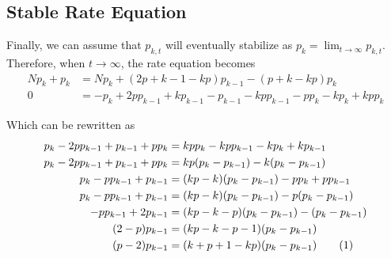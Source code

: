 \subsection{Stable Rate Equation}

    Finally, we can assume that $p_{k,t}$ will eventually stabilize as $p_k = \lim_{t \to \infty} p_{k,t}$. Therefore, when $t \to \infty$, the rate equation becomes
    \begin{align*}
        N p_k + p_k &= N p_k + (2p + k - 1 - k p) p_{k-1} - (p + k - k p) p_k \\
        0 &= -p_k + 2p p_{k-1} + k p_{k-1} - p_{k-1} - k p p_{k-1} - p p_k - k p_k + k p p_k
    \end{align*}

    Which can be rewritten as
    \begin{align*}
        p_k - 2p p_{k-1} + p_{k-1} + p p_k &= k p p_k - k p p_{k-1} - k p_{k} + k p_{k-1} \\
        p_k - 2 p p_{k-1} + p_{k-1} + p p_k &= k p (p_k - p_{k-1}) - k (p_k - p_{k-1}) \\
        p_k - p p_{k-1} + p_{k-1} &= (k p - k) (p_k - p_{k-1}) - p p_k + p p_{k-1} \\
        p_k - p p_{k-1} + p_{k-1} &= (k p - k) (p_k - p_{k-1}) - p (p_k - p_{k-1}) \\
        - p p_{k-1} + 2 p_{k-1} &= (k p - k - p) (p_k - p_{k-1}) - (p_k - p_{k-1}) \\
        (2 - p) p_{k-1} &= (k p - k - p - 1) (p_k - p_{k-1}) \\
        (p - 2) p_{k-1} &= (k + p + 1 - k p) (p_k - p_{k-1})
        \addtocounter{equation}{1}\tag{\theequation} \label{eq:stable}
    \end{align*}
